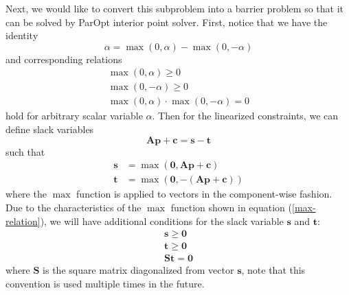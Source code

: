\documentclass[12pt]{article}
\newcommand{\mb}{\mathbf}
\begin{document}
Next, we would like to convert this subproblem into a barrier problem so that it can be solved by ParOpt interior point solver. First, notice that we have the identity
%
\begin{equation}
    \alpha = \max(0, \alpha) - \max(0, -\alpha)
\end{equation}
%
and corresponding relations
%
\begin{equation}
\label{max-relation}
\begin{gathered}
    \max(0, \alpha) \ge 0 \\
    \max(0, -\alpha) \ge 0 \\
    \max(0, \alpha)\cdot \max(0, -\alpha) = 0
\end{gathered}
\end{equation}
%
hold for arbitrary scalar variable $\alpha$. Then for the linearized constraints, we can define slack variables
%
\begin{equation}
    \mb{A}\mb{p} + \mb{c} = \mb{s} - \mb{t}
\end{equation}
%
such that
%
\begin{equation}
\begin{aligned}
    \mb{s} & = \max(\mb{0}, \mb{A}\mb{p} + \mb{c}) \\
    \mb{t} & = \max(\mb{0}, -(\mb{A}\mb{p} + \mb{c}))
\end{aligned}
\end{equation}
%
where the $\max$ function is applied to vectors in the component-wise fashion. Due to the characteristics of the $\max$ function shown in equation (\ref{max-relation}), we will have additional conditions for the slack variable $\mb{s}$ and $\mb{t}$:
%
\begin{equation}
\label{eqn:S}
    \begin{gathered}
    \mb{s} \ge \mb{0} \\
    \mb{t} \ge \mb{0} \\
    \mb{S} \mb{t} = \mb{0}
    \end{gathered}
\end{equation}
%
where $\mb{S}$ is the square matrix diagonalized from vector $\mb{s}$, note that this convention is used multiple times in the future.
\end{document}
